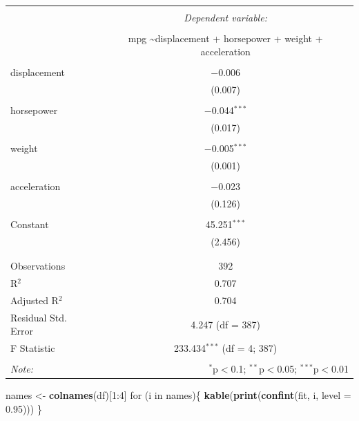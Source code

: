 \documentclass[]{article}
\newenvironment{Shaded}{\begin{snugshade}}{\end{snugshade}}
\newcommand{\KeywordTok}[1]{\textcolor[rgb]{0.13,0.29,0.53}{\textbf{{#1}}}}
\newcommand{\DataTypeTok}[1]{\textcolor[rgb]{0.13,0.29,0.53}{{#1}}}
\newcommand{\DecValTok}[1]{\textcolor[rgb]{0.00,0.00,0.81}{{#1}}}
\newcommand{\FloatTok}[1]{\textcolor[rgb]{0.00,0.00,0.81}{{#1}}}
\newcommand{\StringTok}[1]{\textcolor[rgb]{0.31,0.60,0.02}{{#1}}}
\newcommand{\NormalTok}[1]{{#1}}
\begin{document}
\begin{table}[!htbp] \centering 
  \caption{} 
  \label{} 
\begin{tabular}{@{\extracolsep{5pt}}lc} 
\\[-1.8ex]\hline 
\hline \\[-1.8ex] 
 & \multicolumn{1}{c}{\textit{Dependent variable:}} \\ 
\cline{2-2} 
\\[-1.8ex] & mpg \textasciitilde displacement + horsepower + weight + acceleration \\ 
\hline \\[-1.8ex] 
 displacement & $-$0.006 \\ 
  & (0.007) \\ 
  & \\ 
 horsepower & $-$0.044$^{***}$ \\ 
  & (0.017) \\ 
  & \\ 
 weight & $-$0.005$^{***}$ \\ 
  & (0.001) \\ 
  & \\ 
 acceleration & $-$0.023 \\ 
  & (0.126) \\ 
  & \\ 
 Constant & 45.251$^{***}$ \\ 
  & (2.456) \\ 
  & \\ 
\hline \\[-1.8ex] 
Observations & 392 \\ 
R$^{2}$ & 0.707 \\ 
Adjusted R$^{2}$ & 0.704 \\ 
Residual Std. Error & 4.247 (df = 387) \\ 
F Statistic & 233.434$^{***}$ (df = 4; 387) \\ 
\hline 
\hline \\[-1.8ex] 
\textit{Note:}  & \multicolumn{1}{r}{$^{*}$p$<$0.1; $^{**}$p$<$0.05; $^{***}$p$<$0.01} \\ 
\end{tabular} 
\end{table}

\begin{Shaded}
\begin{Highlighting}[]
\NormalTok{names <-}\StringTok{ }\KeywordTok{colnames}\NormalTok{(df)[}\DecValTok{1}\NormalTok{:}\DecValTok{4}\NormalTok{]}
\NormalTok{for (i in names)\{}
\KeywordTok{kable}\NormalTok{(}\KeywordTok{print}\NormalTok{(}\KeywordTok{confint}\NormalTok{(fit, i, }\DataTypeTok{level =} \FloatTok{0.95}\NormalTok{)))}
\NormalTok{\}}
\end{Highlighting}
\end{Shaded}
\end{document}
